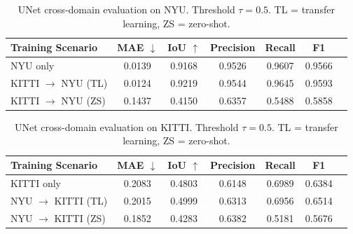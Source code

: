 \begin{table}[H]
  \centering
  \caption{UNet cross-domain evaluation on NYU. Threshold $\tau=0.5$. TL = transfer learning, ZS = zero-shot.}
  \label{tab:unet_cross_domain_nyu}
  \begin{tabular}{lcccccc}
    \toprule
    Training Scenario & MAE $\downarrow$ & IoU $\uparrow$ & Precision & Recall & F1 \\ 
    \midrule
    NYU only & 0.0139 & 0.9168 & 0.9526 & 0.9607 & 0.9566 \\
    KITTI $\rightarrow$ NYU (TL) & 0.0124 & 0.9219 & 0.9544 & 0.9645 & 0.9593 \\
    KITTI $\rightarrow$ NYU (ZS) & 0.1437 & 0.4150 & 0.6357 & 0.5488 & 0.5858 \\
    \bottomrule
  \end{tabular}
\end{table}





\begin{table}[H]
  \centering
  \caption{UNet cross-domain evaluation on KITTI. Threshold $\tau=0.5$. TL = transfer learning, ZS = zero-shot.}
  \label{tab:unet_cross_domain_kitti}
  \begin{tabular}{lcccccc}
    \toprule
    Training Scenario & MAE $\downarrow$ & IoU $\uparrow$ & Precision & Recall & F1 \\ 
    \midrule
    KITTI only & 0.2083 & 0.4803 & 0.6148 & 0.6989 & 0.6384 \\
    NYU $\rightarrow$ KITTI (TL) & 0.2015 & 0.4999 & 0.6313 & 0.6956 & 0.6514 \\
    NYU $\rightarrow$ KITTI (ZS) & 0.1852 & 0.4283 & 0.6382 & 0.5181 & 0.5676 \\
    \bottomrule
  \end{tabular}
\end{table}



